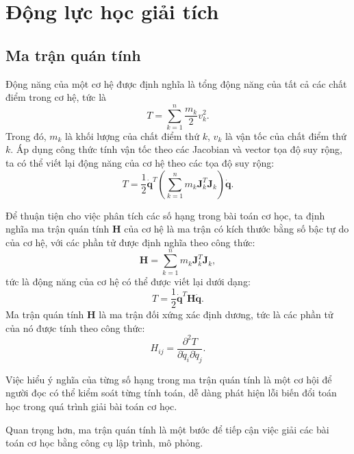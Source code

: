 \section{Động lực học giải tích}
\label{sec:10:Analytical_mechanics}

\subsection{Ma trận quán tính}

Động năng của một cơ hệ được định nghĩa là tổng động năng của tất cả các chất điểm trong cơ hệ, tức là
\begin{equation}
    T = \sum_{k=1}^{n} \dfrac{m_k}{2} v_k^2.
\end{equation}
Trong đó, \(m_k\) là khối lượng của chất điểm thứ \(k\), \(v_k\) là vận tốc của chất điểm thứ \(k\). Áp dụng công thức tính vận tốc theo các Jacobian và vector tọa độ suy rộng, ta có thể viết lại động năng của cơ hệ theo các tọa độ suy rộng:
\begin{equation}
    T = \dfrac{1}{2} \mathbf{\dot{q}}^T \left( \sum_{k=1}^{n} m_k \mathbf{J}_k^T \mathbf{J}_k \right) \mathbf{\dot{q}}.
\end{equation}


Để thuận tiện cho việc phân tích các số hạng trong bài toán cơ học, ta định nghĩa ma trận quán tính \(\mathbf{H}\) của cơ hệ là ma trận có kích thước bằng số bậc tự do của cơ hệ, với các phần tử được định nghĩa theo công thức:
\begin{equation}
    \mathbf{H} = \sum_{k=1}^{n} m_k \mathbf{J}_k^T \mathbf{J}_k,
\end{equation}
tức là động năng của cơ hệ có thể được viết lại dưới dạng:
\begin{equation}
    T = \dfrac{1}{2} \mathbf{\dot{q}}^T \mathbf{H} \mathbf{\dot{q}}.
\end{equation}
Ma trận quán tính \(\mathbf{H}\) là ma trận đối xứng xác định dương, tức là các phần tử của nó được tính theo công thức:
\begin{equation}
    H_{ij} = \dfrac{\partial^2 T}{\partial \dot{q}_i \partial \dot{q}_j}.
\end{equation}

Việc hiểu ý nghĩa của từng số hạng trong ma trận quán tính là một cơ hội để người đọc có thể kiểm soát từng tính toán, dễ dàng phát hiện lỗi biến đổi toán học trong quá trình giải bài toán cơ học.

Quan trọng hơn, ma trận quán tính là một bước để tiếp cận việc giải các bài toán cơ học bằng công cụ lập trình, mô phỏng.

